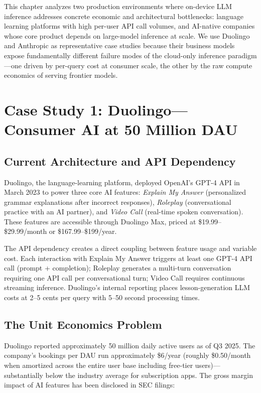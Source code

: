 \documentclass[12pt, letterpaper, twoside]{report}
\begin{document}
This chapter analyzes two production environments where on-device LLM inference addresses concrete economic and architectural bottlenecks: language learning platforms with high per-user API call volumes, and AI-native companies whose core product depends on large-model inference at scale. We use Duolingo and Anthropic as representative case studies because their business models expose fundamentally different failure modes of the cloud-only inference paradigm---one driven by per-query cost at consumer scale, the other by the raw compute economics of serving frontier models.

\section{Case Study 1: Duolingo---Consumer AI at 50 Million DAU}
\label{sec:duolingo}

\subsection{Current Architecture and API Dependency}

Duolingo, the language-learning platform, deployed OpenAI's GPT-4 API in March 2023 to power three core AI features: \textit{Explain My Answer} (personalized grammar explanations after incorrect responses), \textit{Roleplay} (conversational practice with an AI partner), and \textit{Video Call} (real-time spoken conversation). These features are accessible through Duolingo Max, priced at \$19.99--\$29.99/month or \$167.99--\$199/year.

The API dependency creates a direct coupling between feature usage and variable cost. Each interaction with Explain My Answer triggers at least one GPT-4 API call (prompt + completion); Roleplay generates a multi-turn conversation requiring one API call per conversational turn; Video Call requires continuous streaming inference. Duolingo's internal reporting places lesson-generation LLM costs at 2--5 cents per query with 5--50 second processing times.

\subsection{The Unit Economics Problem}

Duolingo reported approximately 50 million daily active users as of Q3 2025. The company's bookings per DAU run approximately \$6/year (roughly \$0.50/month when amortized across the entire user base including free-tier users)---substantially below the industry average for subscription apps. The gross margin impact of AI features has been disclosed in SEC filings:
\end{document}
